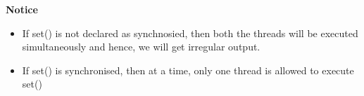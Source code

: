 \begin{flushleft}
	\textbf{Notice}
	\begin{itemize}
		\item If set() is not declared as synchnosied, then both the threads will be executed simultaneously and hence, we will get irregular output.	
		\item If set() is synchronised, then at a time, only one thread is allowed to execute set()
	\end{itemize}
	
\end{flushleft}
